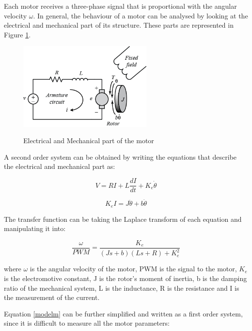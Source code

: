 Each motor receives a three-phase signal that is proportional with the angular velocity $\omega$. In general, the behaviour of a motor can be analysed by looking at the electrical and mechanical part of its structure. These parts are represented in Figure \ref{dc}. 

\begin{figure}[H]
  \centering
    \includegraphics[width=0.6\textwidth]{images/dc.png}
	\caption{Electrical and Mechanical part of the motor}\cite{MotorFig}
	\label{dc}
\end{figure}


A second order system can be obtained by writing the equations that describe the electrical and mechanical part as:

\begin{equation}
	V=RI+L\frac{dI}{dt}+K_{e}\dot{\theta}
\end{equation}

\begin{equation}
   K_{e}I = J \ddot{\theta}+b\dot{\theta}
\end{equation}

The transfer function can be taking the Laplace transform of each equation and manipulating it into:

\begin{equation}
\label{modelm} 
   \frac{\omega}{PWM}=\frac{K_{e}}{(Js+b)(Ls+R)+K_{e}^{2}}
\end{equation}

where $\omega$ is the angular velocity of the motor, PWM is the signal to the motor, $K_{e}$ is the electromotive constant, J is the rotor's moment of inertia, b is the damping ratio of the mechanical system, L is the inductance, R is the resistance and I is the measurement of the current.

Equation \ref{modelm} can be further simplified and written as a first order system, since it is difficult to measure all the motor parameters:\cite{Report1}

